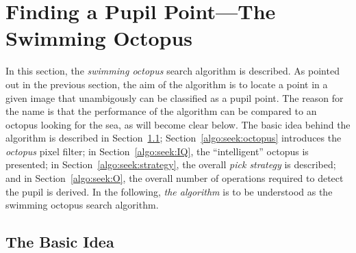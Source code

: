 
\section{Finding a Pupil Point---The Swimming Octopus}
\label{algo:seek}

In this section, the {\em swimming octopus\/} search algorithm is
described.  As pointed out in the previous section, the aim of the
algorithm is to locate a point in a given image that unambigously can
be classified as a pupil point.  The reason for the name is that the
performance of the algorithm can be compared to an octopus looking for
the sea, as will become clear below.  The basic idea behind the
algorithm is described in Section~\ref{algo:seek:idea};
Section~\ref{algo:seek:octopus} introduces the {\em octopus\/} pixel
filter; in Section~\ref{algo:seek:IQ}, the ``intelligent'' octopus is
presented; in Section~\ref{algo:seek:strategy}, the overall {\em pick
  strategy\/} is described; and in Section~\ref{algo:seek:O}, the
overall number of operations required to detect the pupil is derived.
In the following, {\em the algorithm\/} is to be understood as the
swimming octopus search algorithm.

\subsection{The Basic Idea}
\label{algo:seek:idea}


